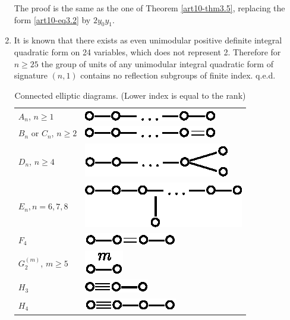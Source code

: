 \begin{enumerate}
The proof is the same as the one of Theorem \ref{art10-thm3.5}, replacing the form \ref{art10-eq3.2} by $2 y_0 y_1$.

\item It is known \cite{art10-key5} that there exists as even unimodular positive definite integral quadratic form on 24 variables, which does not represent 2. Therefore for $n \geqslant 25$ the group of units of any unimodular integral quadratic form of signature $(n,1)$ contains no reflection subgroups of finite index. q.e.d.
{
\renewcommand{\arraystretch}{1.2}
\tabcolsep=10pt
\setcounter{table}{0}
\begin{longtable}{@{}l@{\quad}l@{}}
\caption{Connected elliptic diagrams. (Lower index is equal to the rank)}\\
$A_n$, $n  \geqslant 1$ & {\includegraphics{344a.eps}}\\
$B_n$ or $C_n$, $n \geqslant 2$ & {\includegraphics{344b.eps}}\\
$D_n $, $n \geqslant 4$ & {\includegraphics{344c.eps}}\\
$E_n, n = 6, 7, 8$ & {\includegraphics{344d.eps}}\\
$F_4$ & {\includegraphics{344e.eps}}\\
$G^{(m)}_2$, $m \geqslant 5$ & {\includegraphics{344f.eps}}\\
$H_3$ & {\includegraphics{344g.eps}}\\
$H_4$ & {\includegraphics{344h.eps}}
\end{longtable}}\relax


\end{enumerate}
